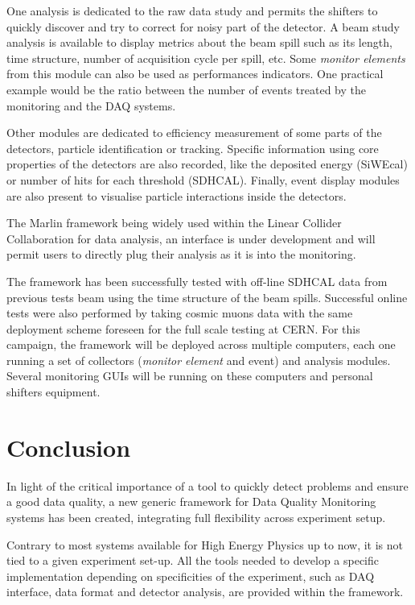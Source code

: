 \documentclass[conference]{IEEEtran}
\begin{document}
One analysis is dedicated to the raw data study and permits the shifters to quickly discover and try to correct for noisy part of the detector. A beam study analysis is available to display metrics about the beam spill such as its length, time structure, number of acquisition cycle per spill, etc. Some \textit{monitor elements} from this module can also be used as performances indicators. One practical example would be the ratio between the number of events treated by the monitoring and the DAQ systems.

Other modules are dedicated to efficiency measurement of some parts of the detectors, particle identification or tracking. Specific information using core properties of the detectors are also recorded, like the deposited energy (SiWEcal) or number of hits for each threshold (SDHCAL). Finally, event display modules are also present to visualise particle interactions inside the detectors.

The Marlin\cite{MARLIN} framework being widely used within the Linear Collider Collaboration for data analysis, an interface is under development and will permit users to directly plug their analysis as it is into the monitoring.

The framework has been successfully tested with off-line SDHCAL data from previous tests beam using the time structure of the beam spills. Successful online tests were also performed by taking cosmic muons data with the same deployment scheme foreseen for the full scale testing at CERN. For this campaign, the framework will be deployed across multiple computers, each one running a set of collectors (\textit{monitor element} and event) and analysis modules. Several monitoring GUIs will be running on these computers and personal shifters equipment.


\section{Conclusion}
In light of the critical importance of a tool to quickly detect problems and ensure a good data quality, a new generic framework for Data Quality Monitoring systems has been created, integrating full flexibility across experiment setup.

Contrary to most systems available for High Energy Physics up to now, it is not tied to a given experiment set-up. All the tools needed to develop a specific implementation depending on specificities of the experiment, such as DAQ interface, data format and detector analysis, are provided within the framework.
\end{document}
